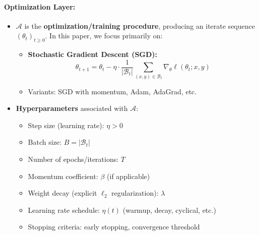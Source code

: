 \documentclass[
  journal=largetwo,
  year=2025,
  volume=37,
]{cup-journal}
\begin{document}
\begin{setting}
\paragraph{Optimization Layer:}
\begin{itemize}
    \item $\mathcal{A}$ is the \textbf{optimization/training procedure}, producing an iterate sequence $(\theta_t)_{t\ge 0}$. In this paper, we focus primarily on:
    \begin{itemize}
        \item \textbf{Stochastic Gradient Descent (SGD):} $$\theta_{t+1} = \theta_t - \eta \cdot \frac{1}{|\mathcal{B}_t|}\sum_{(x,y)\in\mathcal{B}_t} \nabla_\theta \ell(\theta_t; x,y)$$
        \item Variants: SGD with momentum, Adam, AdaGrad, etc.
    \end{itemize}
    \item \textbf{Hyperparameters} associated with $\mathcal{A}$:
    \begin{itemize}
        \item Step size (learning rate): $\eta > 0$
        \item Batch size: $B = |\mathcal{B}_t|$
        \item Number of epochs/iterations: $T$
        \item Momentum coefficient: $\beta$ (if applicable)
        \item Weight decay (explicit $\ell_2$ regularization): $\lambda$
        \item Learning rate schedule: $\eta(t)$ (warmup, decay, cyclical, etc.)
        \item Stopping criteria: early stopping, convergence threshold
    \end{itemize}
\end{itemize}


\end{setting}
\end{document}
